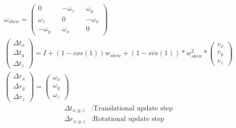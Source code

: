 \documentclass[11pt,a4paper,titlepage,oneside]{report}
\begin{document}
\begin{equation}\label{eq:pe_closed_form}
  \begin{gathered}
    \omega_{skew}=\begin{pmatrix}
      0 && -\omega_z && \omega_y \\
      \omega_z && 0 && -\omega_x \\
      -\omega_y && \omega_x && 0
    \end{pmatrix}\\
    \begin{pmatrix}
      \Delta t_x\\
      \Delta t_y\\
      \Delta t_z
    \end{pmatrix}=
    I+(1-cos(1))w_{skew}+(1-sin(1))*w_{skew}^2*\begin{pmatrix}
      v_x\\
      v_y\\
      v_z
    \end{pmatrix}\\
    \begin{pmatrix}
      \Delta r_x\\
      \Delta r_y\\
      \Delta r_z
    \end{pmatrix}=
    \begin{pmatrix}
      \omega_x\\
      \omega_y\\
      \omega_z
    \end{pmatrix}
  \end{gathered}
\end{equation}
\begin{align*}
  \Delta t_{x,y,z}    &: \text{Translational update step}\\
  \Delta r_{x,y,z}    &: \text{Rotational update step}
\end{align*}
\end{document}
